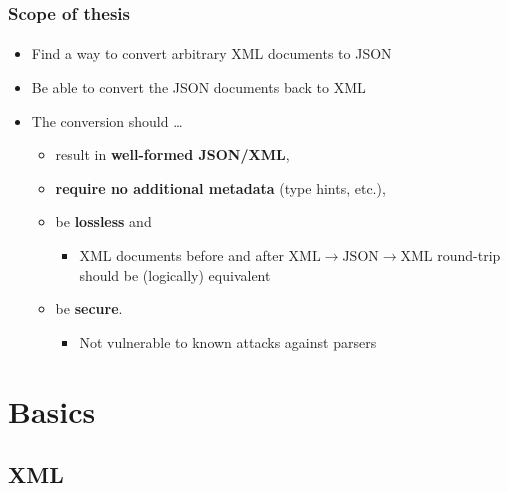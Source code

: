 \documentclass[
    alternativetitlepage=alternativ,
    cornerlogo=hgi_nds_logo2,
    sectionoverview,
]{rubpresentation}
\begin{document}
\begin{frame}
    \frametitle{Scope of thesis}
    \framesubtitle{}
    \begin{itemize}
        \item{} Find a way to convert arbitrary XML documents to JSON\\
        \item{} Be able to convert the JSON documents back to XML\\
        \item{} The conversion should \ldots\
            \begin{itemize}
                \item{} result in \textbf{well-formed JSON/XML},
                \item{} \textbf{require no additional metadata} (type hints, etc.),\\
                \item{} be \textbf{lossless} and
                    \begin{itemize}
                        \item{} XML documents before and after %
                                $\text{XML}\rightarrow\text{JSON}\rightarrow\text{XML}$ %
                                round-trip should be (logically) equivalent\\
                    \end{itemize}
                \item{} be \textbf{secure}.
                    \begin{itemize}
                        \item{} Not vulnerable to known attacks against parsers\\
                    \end{itemize}
            \end{itemize}
    \end{itemize}
\end{frame}


\section{Basics}

\subsection{XML}
\end{document}
